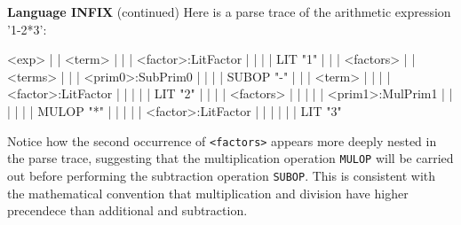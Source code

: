\begin{minipage}[t]{\sw}
\slidenumber
\LARGE
{\bf Language INFIX} (continued)\exx
Here is a parse trace of the arithmetic expression '1-2*3':
{\Large
\begin{qv}
<exp>
| | <term>
| | | <factor>:LitFactor
| | | | LIT "1"
| | | <factors>
| | <terms>
| | | <prim0>:SubPrim0
| | | | SUBOP "-"
| | | <term>
| | | | <factor>:LitFactor
| | | | | LIT "2"
| | | | <factors>
| | | | | <prim1>:MulPrim1
| | | | | | MULOP "*"
| | | | | <factor>:LitFactor
| | | | | | LIT "3"
\end{qv}
}
Notice how the second occurrence of \verb'<factors>' appears
more deeply nested in the parse trace,
suggesting that the multiplication operation \verb'MULOP'
will be carried out
before performing the subtraction operation \verb'SUBOP'.
This is consistent with the mathematical convention
that multiplication and division have higher precendece
than additional and subtraction.
\end{minipage}
